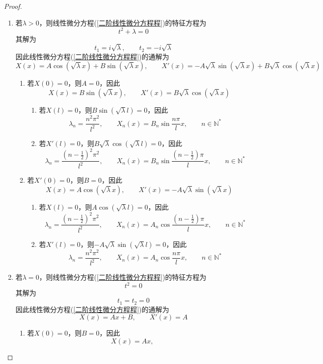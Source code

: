 \documentclass[lang = cn, scheme = chinese, thmcnt = section]{elegantbook}
\newcommand{\N}{\mathbb{N}}            %
\begin{document}
\begin{proof}
	\begin{enumerate}
		\item 若$\lambda>0$，则线性微分方程(\ref{二阶线性微分方程程})的特征方程为%
		$$
		t^2+\lambda=0
		$$
		其解为%
		$$
		t_1=i\sqrt{\lambda},\qquad
		t_2=-i\sqrt{\lambda}
		$$
		因此线性微分方程(\ref{二阶线性微分方程程})的通解为%
		$$
		X(x)=A\cos(\sqrt{\lambda}x)+B\sin(\sqrt{\lambda}x),\qquad
		X'(x)=-A\sqrt{\lambda}\sin(\sqrt{\lambda}x)+B\sqrt{\lambda}\cos(\sqrt{\lambda}x)
		$$
		\begin{enumerate}
			\item 若$X(0)=0$，则$A=0$，因此%
			$$
			X(x)=B\sin(\sqrt{\lambda}x),\qquad
			X'(x)=B\sqrt{\lambda}\cos(\sqrt{\lambda}x)
			$$
			\begin{enumerate}
				\item 若$X(l)=0$，则$B\sin(\sqrt{\lambda}l)=0$，因此
				$$
				\lambda_n=\frac{n^2\pi^2}{l^2},\qquad 
				X_n(x)=B_n\sin\frac{n\pi}{l}x,\qquad n\in\N^*
				$$
				\item 若$X'(l)=0$，则$B\sqrt{\lambda}\cos(\sqrt{\lambda}l)=0$，因此
				$$
				\lambda_n=\frac{\left(n-\frac{1}{2}\right)^2\pi^2}{l^2},\qquad 
				X_n(x)=B_n\sin\frac{\left(n-\frac{1}{2}\right)\pi}{l}x,\qquad n\in\N^*
				$$
			\end{enumerate}
			\item 若$X'(0)=0$，则$B=0$，因此%
			$$
			X(x)=A\cos(\sqrt{\lambda}x),\qquad
			X'(x)=-A\sqrt{\lambda}\sin(\sqrt{\lambda}x)
			$$
			\begin{enumerate}
				\item 若$X(l)=0$，则$A\cos(\sqrt{\lambda}l)=0$，因此
				$$
				\lambda_n=\frac{\left(n-\frac{1}{2}\right)^2\pi^2}{l^2},\qquad 
				X_n(x)=A_n\cos\frac{\left(n-\frac{1}{2}\right)\pi}{l}x,\qquad n\in\N^*
				$$
				\item 若$X'(l)=0$，则$-A\sqrt{\lambda}\sin(\sqrt{\lambda}l)=0$，因此
				$$
				\lambda_n=\frac{n^2\pi^2}{l^2},\qquad 
				X_n(x)=A_n\cos\frac{n\pi}{l}x,\qquad n\in\N^*
				$$
			\end{enumerate}
		\end{enumerate}
		\item 若$\lambda=0$，则线性微分方程(\ref{二阶线性微分方程程})的特征方程为%
		$$
		t^2=0
		$$
		其解为%
		$$
		t_1=t_2=0
		$$
		因此线性微分方程(\ref{二阶线性微分方程程})的通解为%
		$$
		X(x)=Ax+B,\qquad
		X'(x)=A
		$$
		\begin{enumerate}
			\item 若$X(0)=0$，则$B=0$，因此
			$$
			X(x)=Ax,\qquad
$$
\end{enumerate}
\end{enumerate}
\end{proof}
\end{document}
